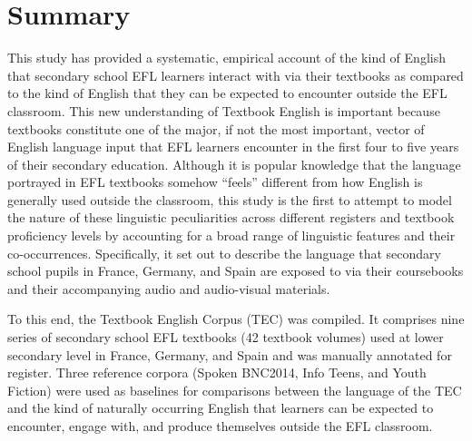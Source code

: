 \documentclass[
  letterpaper,
  DIV=11,
  numbers=noendperiod]{scrreprt}
\begin{document}
\section{Summary}\label{summary}

This study has provided a systematic, empirical account of the kind of
English that secondary school EFL learners interact with via their
textbooks as compared to the kind of English that they can be expected
to encounter outside the EFL classroom. This new understanding of
Textbook English is important because textbooks constitute one of the
major, if not the most important, vector of English language input that
EFL learners encounter in the first four to five years of their
secondary education. Although it is popular knowledge that the language
portrayed in EFL textbooks somehow ``feels'' different from how English
is generally used outside the classroom, this study is the first to
attempt to model the nature of these linguistic peculiarities across
different registers and textbook proficiency levels by accounting for a
broad range of linguistic features and their co-occurrences.
Specifically, it set out to describe the language that secondary school
pupils in France, Germany, and Spain are exposed to via their
coursebooks and their accompanying audio and audio-visual materials.

To this end, the Textbook English Corpus (TEC) was compiled. It
comprises nine series of secondary school EFL textbooks (42 textbook
volumes) used at lower secondary level in France, Germany, and Spain and
was manually annotated for register. Three reference corpora (Spoken
BNC2014, Info Teens, and Youth Fiction) were used as baselines for
comparisons between the language of the TEC and the kind of naturally
occurring English that learners can be expected to encounter, engage
with, and produce themselves outside the EFL classroom.
\end{document}
